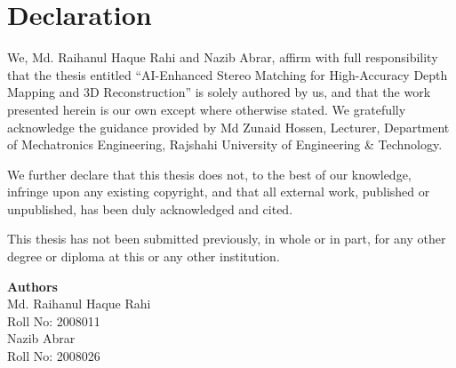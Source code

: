 \chapter*{Declaration}

We, Md. Raihanul Haque Rahi and Nazib Abrar, affirm with full
responsibility that the thesis entitled ``AI-Enhanced Stereo Matching for
High-Accuracy Depth Mapping and 3D Reconstruction'' is solely authored by
us, and that the work presented herein is our own except where otherwise
stated. We gratefully acknowledge the guidance provided by Md Zunaid
Hossen, Lecturer, Department of Mechatronics Engineering, Rajshahi
University of Engineering \& Technology.

\vspace{1em}

We further declare that this thesis does not, to the best of our
knowledge, infringe upon any existing copyright, and that all external
work, published or unpublished, has been duly acknowledged and cited.

\vspace{1em}

This thesis has not been submitted previously, in whole or in part, for
any other degree or diploma at this or any other institution.

\vspace{3em}

\begin{flushright}
\textbf{Authors}\\[1.6em]
Md. Raihanul Haque Rahi\\
Roll No: 2008011\\[1.2em]
Nazib Abrar\\
Roll No: 2008026
\end{flushright}
